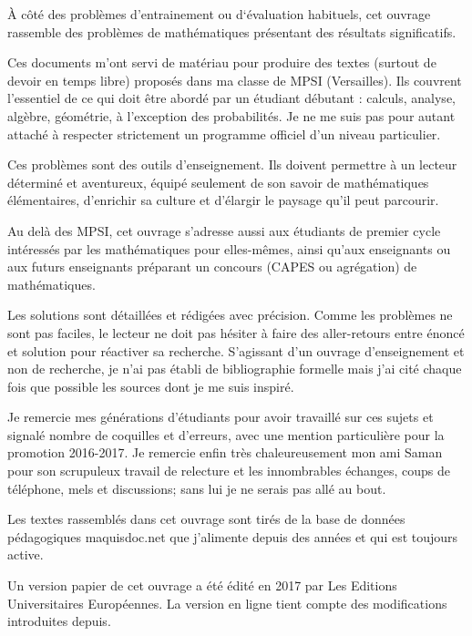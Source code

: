 À côté des problèmes d'entrainement ou d`évaluation habituels, cet ouvrage rassemble des problèmes de mathématiques présentant des résultats significatifs.  

Ces documents m'ont servi de matériau pour produire des textes (surtout de devoir en temps libre) proposés dans ma classe de MPSI (Versailles). Ils couvrent l'essentiel de ce qui doit être abordé par un étudiant débutant : calculs, analyse, algèbre, géométrie, à l'exception des probabilités. Je ne me suis pas pour autant attaché à respecter strictement un programme officiel d'un niveau particulier.

Ces problèmes sont des outils d'enseignement. Ils doivent permettre à un lecteur déterminé et aventureux, équipé seulement de son savoir de \og mathématiques élémentaires\fg, d'enrichir sa culture et d'élargir le paysage qu'il peut parcourir.

Au delà des MPSI, cet ouvrage s'adresse aussi aux étudiants de premier cycle intéressés par les mathématiques pour elles-mêmes, ainsi qu'aux enseignants ou aux futurs enseignants préparant un concours (CAPES ou agrégation) de mathématiques. 

Les solutions sont détaillées et rédigées avec précision. Comme les problèmes ne sont pas faciles, le lecteur ne doit pas hésiter à faire des aller-retours entre énoncé et solution pour réactiver sa recherche. S'agissant d'un ouvrage d'enseignement et non de recherche, je n'ai pas établi de bibliographie formelle mais j'ai cité chaque fois que possible les sources dont je me suis inspiré.

Je remercie mes générations d'étudiants pour avoir travaillé sur ces sujets et signalé nombre de coquilles et d'erreurs, avec une mention particulière pour la promotion 2016-2017. Je remercie enfin très chaleureusement mon ami Saman pour son scrupuleux travail de relecture et les innombrables échanges, coups de téléphone, mels et discussions; sans lui je ne serais pas allé au bout.

Les textes rassemblés dans cet ouvrage sont tirés de la base de données pédagogiques maquisdoc.net que j'alimente depuis des années et qui est toujours active. 

Un version papier de cet ouvrage a été édité en 2017 par Les Editions Universitaires Européennes. La version en ligne tient compte des modifications introduites depuis.

